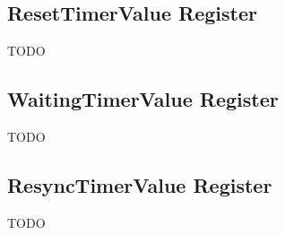 \subsection{ResetTimerValue Register} 
\label{sec:resettimervaluereg}
TODO
\subsection{WaitingTimerValue Register} 
\label{sec:WaitingTimerValueReg}
TODO
\subsection{ResyncTimerValue Register} 
\label{sec:ResyncTimerValueReg}
TODO

	